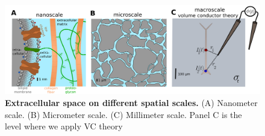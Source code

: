 \begin{figure}[!ht]
\begin{center}
\includegraphics[width=1.0\textwidth]{Figures/VC/ecs_scales_three_levels.png}
\end{center}
\caption{\textbf{Extracellular space on different spatial scales.} (A) Nanometer scale. (B) Micrometer scale. (C) Millimeter scale. 
Panel C is the level where we apply VC theory
}
\label{fig:Basics:ECS_scales_3levels}
\end{figure}

